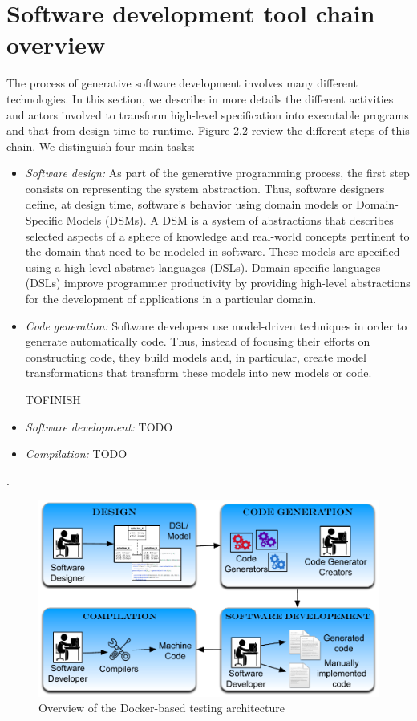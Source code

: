 \section{Software development tool chain overview}
The process of generative software development involves many different technologies. In this section, we describe in more details the different activities and actors involved to transform high-level specification into executable programs and that from design time to runtime. 
Figure 2.2 review the different steps of this chain. We distinguish four main tasks: 
\begin{itemize}
\item \textit{Software design:} As part of the generative programming process, the first step consists on representing the system abstraction. Thus, software designers define, at design time, software’s behavior using domain models or Domain-Specific Models (DSMs). A DSM is a system of abstractions that describes selected aspects of a sphere of knowledge and real-world concepts pertinent to the domain that need to be modeled in software. These models are specified using a high-level abstract languages (DSLs). Domain-specific languages (DSLs) improve programmer productivity by providing high-level abstractions for the development of applications in a particular domain.

\item \textit{Code generation:} Software developers use model-driven techniques in order to generate automatically code. Thus, instead of focusing their efforts on constructing code, they build models and, in particular, create model transformations that transform these models into new models or code. 

TOFINISH
\item \textit{Software development:}
TODO
\item \textit{Compilation:}
TODO
\end{itemize} 
.
\begin{figure}[h]
\center
	\includegraphics[scale=0.65]{Background/fig/background_overview2.pdf}
	\caption{Overview of the Docker-based testing architecture}
\end{figure}


